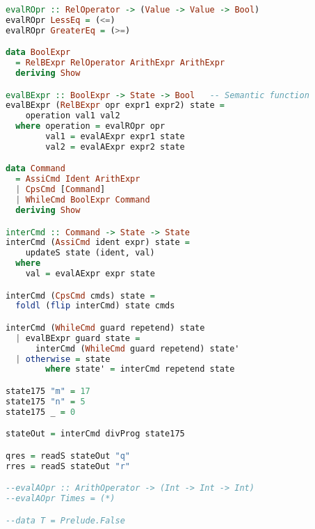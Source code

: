 \begin{lstlisting}[language=Haskell]
evalROpr :: RelOperator -> (Value -> Value -> Bool)
evalROpr LessEq = (<=)
evalROpr GreaterEq = (>=)

data BoolExpr
  = RelBExpr RelOperator ArithExpr ArithExpr
  deriving Show

evalBExpr :: BoolExpr -> State -> Bool   -- Semantic function
evalBExpr (RelBExpr opr expr1 expr2) state =
    operation val1 val2
  where operation = evalROpr opr
        val1 = evalAExpr expr1 state
        val2 = evalAExpr expr2 state

data Command
  = AssiCmd Ident ArithExpr
  | CpsCmd [Command]
  | WhileCmd BoolExpr Command
  deriving Show

interCmd :: Command -> State -> State
interCmd (AssiCmd ident expr) state =
    updateS state (ident, val)
  where
    val = evalAExpr expr state

interCmd (CpsCmd cmds) state =
  foldl (flip interCmd) state cmds

interCmd (WhileCmd guard repetend) state
  | evalBExpr guard state =
      interCmd (WhileCmd guard repetend) state'
  | otherwise = state
        where state' = interCmd repetend state

state175 "m" = 17
state175 "n" = 5
state175 _ = 0

stateOut = interCmd divProg state175

qres = readS stateOut "q"
rres = readS stateOut "r"

--evalAOpr :: ArithOperator -> (Int -> Int -> Int)
--evalAOpr Times = (*)

--data T = Prelude.False
\end{lstlisting}
\clearpage